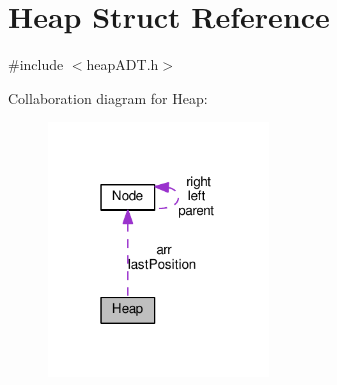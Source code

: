 \hypertarget{structHeap}{}\section{Heap Struct Reference}
\label{structHeap}


{\ttfamily \#include $<$heap\+A\+D\+T.\+h$>$}



Collaboration diagram for Heap\+:\nopagebreak
\begin{figure}[H]
\begin{center}
\leavevmode
\includegraphics[width=166pt]{structHeap__coll__graph}
\end{center}
\end{figure}
